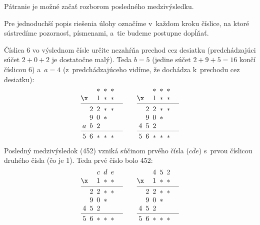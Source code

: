 {%
\napad
Pátranie je možné začať rozborom posledného medzivýsledku.

\riesenie
Pre jednoduchší popis riešenia úlohy označíme v~každom kroku číslice, na ktoré sústredíme pozornosť, písmenami, a~tie budeme postupne dopĺňať.

Číslica 6 vo výslednom čísle určite nezahŕňa prechod cez desiatku (predchádzajúci súčet $2+0+2$ je dostatočne malý).
Teda $b=5$ (jedine súčet $2+9+5=16$ končí číslicou 6)
a~$a=4$ (z~predchádzajúceho vidíme, že dochádza k~prechodu cez desiatku):
$$
\vbox{\let\\=\cr
\halign{&\hbox to1.0em{\hss$#$\hss}\\
   &&*&*&* \\
\x &&1&*&* \\
\noalign{\vskip4pt\hrule\vskip4pt}
  &2&2&*&* \\
  &9&0&*&& \\
  a&b&2&&& \\
\noalign{\vskip4pt\hrule\vskip4pt}
 5&6&*&*&* \\
}} \qquad
\vbox{\let\\=\cr
\halign{&\hbox to1.0em{\hss$#$\hss}\\
   &&*&*&* \\
\x &&1&*&* \\
\noalign{\vskip4pt\hrule\vskip4pt}
  &2&2&*&* \\
  &9&0&*&& \\
  4&5&2&&& \\
\noalign{\vskip4pt\hrule\vskip4pt}
 5&6&*&*&* \\
}}
$$

Posledný medzivýsledok (452) vzniká súčinom prvého čísla ($\overline{cde}$) s~prvou číslicou druhého čísla (čo je 1).
Teda prvé číslo bolo 452:
$$
\vbox{\let\\=\cr
\halign{&\hbox to1.0em{\hss$#$\hss}\\
   &&c&d&e \\
\x &&1&*&* \\
\noalign{\vskip4pt\hrule\vskip4pt}
  &2&2&*&* \\
  &9&0&*&& \\
  4&5&2&&& \\
\noalign{\vskip4pt\hrule\vskip4pt}
 5&6&*&*&* \\
}} \qquad
\vbox{\let\\=\cr
\halign{&\hbox to1.0em{\hss$#$\hss}\\
   &&4&5&2 \\
\x &&1&*&* \\
\noalign{\vskip4pt\hrule\vskip4pt}
  &2&2&*&* \\
  &9&0&*&& \\
  4&5&2&&& \\
\noalign{\vskip4pt\hrule\vskip4pt}
 5&6&*&*&* \\
}}
$$

}
